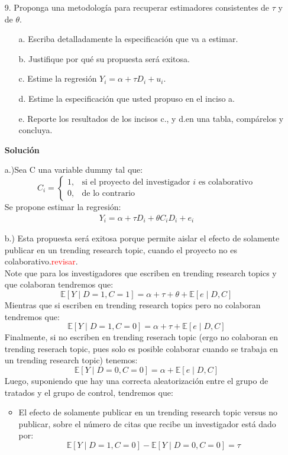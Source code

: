 \documentclass[a4paper, answers, addpoints, 11pt]{exam}
\newenvironment{solucion}{%
  \begin{mdframed}[
    backgroundcolor=blue!5,    %
    linecolor=blue!50,          %
    linewidth=2pt,              %
    leftmargin=10pt,            %
    rightmargin=10pt,           %
    topline=true,              %
    bottomline=true,            %
    roundcorner=10pt,           %
    innerleftmargin=10pt,       %
    innerrightmargin=10pt,      %
    innerbottommargin=10pt,     %
    innertopmargin=10pt         %
  ]%
  \begin{tcolorbox}[colframe=blue!50!black, colback=blue!50, coltitle=white, sharp corners=all, boxrule=1mm, width=\textwidth, halign=left, valign=center, top=0mm, bottom=0mm, left=0mm, right=0mm] \textbf{Solución} \end{tcolorbox} }{\end{mdframed}}
\begin{document}
\begin{itemize}
    \item[9.] Proponga una metodología para recuperar estimadores consistentes de $\tau$ y de $\theta$. 

    \begin{itemize}
        \item[a.] Escriba detalladamente la especificación que va a estimar.
        

        \item[b.] Justifique por qué su propuesta será exitosa.

        \item[c.] Estime la regresión $Y_i = \alpha + \tau D_i + u_i$.

        \item[d.] Estime la especificación que usted propuso en el inciso a.

        \item[e.] Reporte los resultados de los incisos c., y d.en una tabla, compárelos y concluya. 

    \end{itemize}
     \begin{solucion}
        
        a.)Sea C una variable dummy tal que:
        \[
C_i =
\begin{cases} 
1, & \text{si el proyecto del investigador } i \text{ es colaborativo} \\
0, & \text{de lo contrario}
\end{cases}
\]
Se propone estimar la regresión: 
\begin{gather}\label{sinsesgoautores}
    Y_i = \alpha+\tau D_i + \theta C_i D_i+ e_i
\end{gather}


       


        b.) Esta propuesta será exitosa porque permite aislar el efecto de solamente publicar en un trending research topic, cuando el proyecto no es colaborativo.\textcolor{red}{revisar}. \\
          
        
        Note que para los investigadores que escriben en trending research topics y que colaboran tendremos que:
       \[
\mathbb{E}[Y \mid D=1, C=1] = \alpha + \tau + \theta +\mathbb{E}[e \mid D, C]
\]
Mientras que si escriben en trending research topics pero no colaboran tendremos que:
       \[
\mathbb{E}[Y \mid D=1, C=0] = \alpha + \tau +\mathbb{E}[e \mid D, C]  
\]
Finalmente, si no escriben en trending reserach topic (ergo no colaboran en trending reserach topic, pues solo es posible colaborar cuando se trabaja en un trending research topic) tenemos:
  \[
\mathbb{E}[Y \mid D=0, C=0] = \alpha +\mathbb{E}[e \mid D, C]  
\]
Luego, suponiendo que hay una correcta aleatorización entre el grupo de tratados y el grupo de control, tendremos que:
\begin{itemize}
    \item El efecto de solamente publicar en un trending research topic versus no publicar, sobre el número de citas que recibe un investigador está dado por:
    \[
\mathbb{E}[Y \mid D=1, C=0]- \mathbb{E}[Y \mid D=0, C=0] =  \tau   
\]


\end{itemize}
\end{solucion}
\end{itemize}
\end{document}
